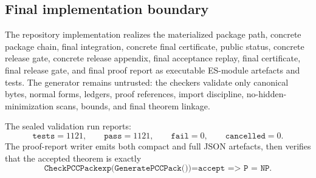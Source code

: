 \documentclass[10.5pt,a4paper]{article}
\begin{document}
\subsection{Final implementation boundary}
The repository implementation realizes the materialized package path, concrete package chain, final integration, concrete final certificate, public status, concrete release gate, concrete release appendix, final acceptance replay, final certificate, final release gate, and final proof report as executable ES-module artefacts and tests.  The generator remains untrusted: the checkers validate only canonical bytes, normal forms, ledgers, proof references, import discipline, no-hidden-minimization scans, bounds, and final theorem linkage.

The sealed validation run reports:
\[
\texttt{tests}=1121,
\qquad
\texttt{pass}=1121,
\qquad
\texttt{fail}=0,
\qquad
\texttt{cancelled}=0.
\]
The proof-report writer emits both compact and full JSON artefacts, then verifies that the accepted theorem is exactly
\[
\texttt{CheckPCCPackexp(GeneratePCCPack())=accept => P = NP}.
\]
\end{document}
